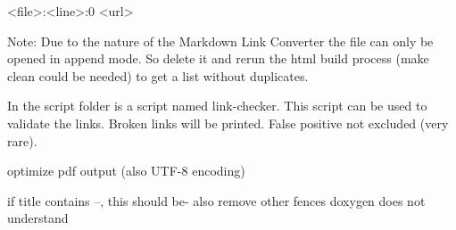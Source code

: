 \begin{DoxyCode}
<file>:<line>:0 <url>
\end{DoxyCode}


Note\+: Due to the nature of the Markdown Link Converter the file can only be opened in append mode. So delete it and rerun the html build process ({\ttfamily make clean} could be needed) to get a list without duplicates.

In the script folder is a script named {\ttfamily link-\/checker}. This script can be used to validate the links. Broken links will be printed. False positive not excluded (very rare).


\begin{DoxyItemize}
\item optimize pdf output (also U\+T\+F-\/8 encoding)
\item if title contains --, this should be-\/ also remove other fences doxygen does not understand 
\end{DoxyItemize}